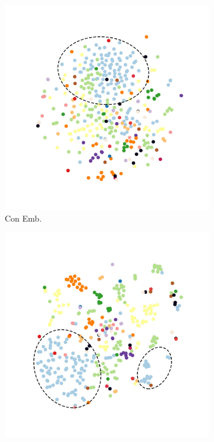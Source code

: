 \documentclass[letterpaper]{article} %
\begin{document}
\begin{figure}[t]
		\begin{subfigure}{.24\textwidth}
			\centering
			\includegraphics[width=\textwidth]{Yang_Liu_doc2vec_new.pdf}
			\caption{Con Emb.}
			\label{fig:subfig:a}
		\end{subfigure}
		\begin{subfigure}{.24\textwidth}
			\centering
			\includegraphics[width=\textwidth]{Yang_Liu_emb_new.pdf}

\end{subfigure}
\end{figure}
\end{document}
